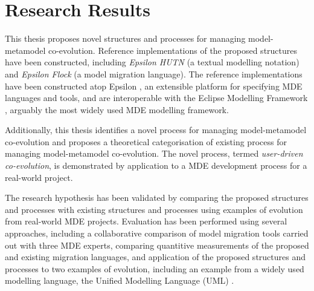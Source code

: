 
\section{Research Results}
\label{sec:research_results}

This thesis proposes novel structures and processes for managing model-metamodel co-evolution. Reference implementations of the proposed structures have been constructed, including \emph{Epsilon HUTN} (a textual modelling notation) and \emph{Epsilon Flock} (a model migration language). The reference implementations have been constructed atop Epsilon \cite{kolovos09thesis}, an extensible platform for specifying MDE languages and tools, and are interoperable with the Eclipse Modelling Framework \cite{steinberg09emf}, arguably the most widely used MDE modelling framework.

Additionally, this thesis identifies a novel process for managing model-metamodel co-evolution and proposes a theoretical categorisation of existing process for managing model-metamodel co-evolution. The novel process, termed \emph{user-driven co-evolution}, is demonstrated by application to a MDE development process for a real-world project.

The research hypothesis has been validated by comparing the proposed structures and processes with existing structures and processes using examples of evolution from real-world MDE projects. Evaluation has been performed using several approaches, including a collaborative comparison of model migration tools carried out with three MDE experts, comparing quantitive measurements of the proposed and existing migration languages, and application of the proposed structures and processes to two examples of evolution, including an example from a widely used modelling language, the Unified Modelling Language (UML) \cite{uml212}.




